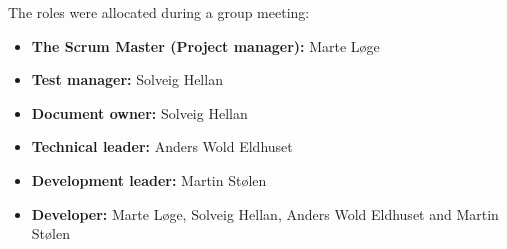 The roles were allocated during a group meeting:
\begin{itemize}
  \item {\bf The Scrum Master (Project manager):} Marte Løge
  \item {\bf Test manager:} Solveig Hellan
  \item {\bf Document owner:} Solveig Hellan
  \item {\bf Technical leader:} Anders Wold Eldhuset
  \item {\bf Development leader:} Martin Stølen
  \item {\bf Developer:} Marte Løge, Solveig Hellan, Anders Wold Eldhuset and Martin Stølen
\end{itemize}





